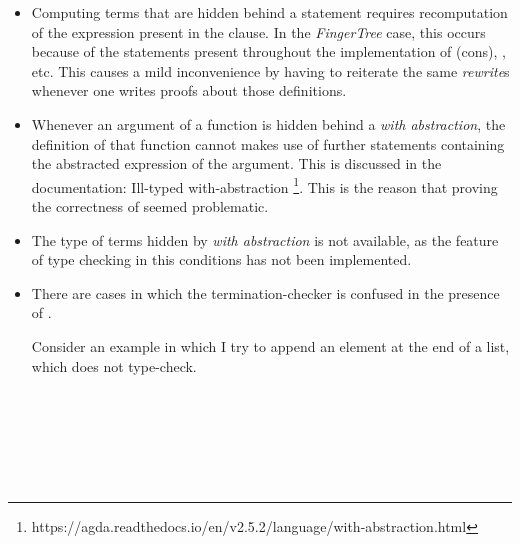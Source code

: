 \documentclass[12pt,twoside,notitlepage]{report}
\begin{document}
\begin{itemize}
\item Computing terms that are hidden behind a  statement requires recomputation of the expression present in the  clause. In the \textit{FingerTree} case, this occurs because of the  statements present throughout the implementation of (cons), ,  etc. This causes a mild inconvenience by having to reiterate the same \textit{rewrite}s whenever one writes proofs about those definitions.

\item Whenever an argument of a function is hidden behind a \textit{with abstraction}, the definition of that function cannot makes use of further  statements containing the abstracted expression of the argument. This is discussed in the documentation: Ill-typed with-abstraction \footnote{https://agda.readthedocs.io/en/v2.5.2/language/with-abstraction.html}.
This is the reason that proving the correctness of  seemed problematic.

\item The type of terms hidden by \textit{with abstraction} is not available, as the feature of type checking in this conditions has not been implemented.

\item There are cases in which the termination-checker is confused in the presence of .

Consider an example in which I try to append an element at the end of a list, which does not type-check.

\begin{code}
\\
\> \AgdaSymbol{:}  \AgdaSymbol{\{}\AgdaSymbol{\}}        \<%
\\
\>    \<%
\\
\>   \AgdaSymbol{|} \AgdaInductiveConstructor{[]} \AgdaSymbol{=}   \AgdaInductiveConstructor{[]}\<%
\\
\>   \AgdaSymbol{|}    \AgdaSymbol{=}   \AgdaSymbol{(}  \AgdaSymbol{)}\<%
\\
\end{code} 

\end{itemize}
\end{document}
